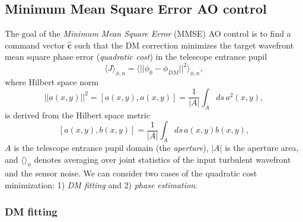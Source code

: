\subsection{Minimum Mean Square Error AO control}
\label{subsec:MMSE-control}

The goal of the \emph{Minimum Mean Square Error} (MMSE)  AO control is to find a command vector $\hat{\bm{c}}$ such that
the DM correction minimizes the target wavefront mean square phase error
(\emph{quadratic cost})  in the
telescope entrance pupil
\begin{equation} \label{eq:mmse-cost}
	\langle J \rangle_{\phi,n} =
	\langle ||\phi_{0}-\phi_{DM}||^{2} \rangle_{\phi,n},
\end{equation}
where Hilbert space norm
\begin{equation} \label{eq:Hilbert-metric}
	|| a(x,y) ||^{2} = [a(x,y),a(x,y)] = \frac{1}{|A|} \int_{A} ds \, a^{2}(x,y),
\end{equation}
is derived from the Hilbert space metric
\begin{equation} \label{eq:Hilbert-metric}
	[a(x,y),b(x,y)] = \frac{1}{|A|} \int_{A} ds \, a(x,y) b(x,y),
\end{equation}
$A$ is the telescope entrance pupil domain (the \emph{aperture}),
 $|A|$ is the aperture area, and $\langle \rangle_{\phi}$
denotes averaging over joint statistics of the input turbulent wavefront and
the sensor noise. We can consider two cases of the quadratic cost
minimization: 1) \emph{DM fitting}  and 2) \emph{phase
estimation}. 

\subsubsection{DM fitting}

